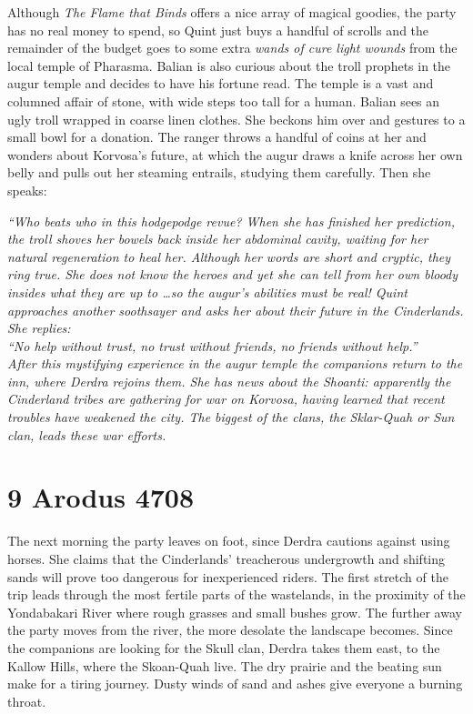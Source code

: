 Although {\itshape The Flame that Binds} offers a nice array of magical goodies, the party has no real money to spend, so Quint just buys a handful of scrolls and the remainder of the budget goes to some extra  {\itshape wands of cure light wounds} from the local temple of Pharasma. Balian is also curious about the troll prophets in the augur temple and decides to have his fortune read. The temple is a vast and columned affair of stone, with wide steps too tall for a human. Balian sees an ugly troll wrapped in coarse linen clothes. She beckons him over and gestures to a small bowl for a donation. The ranger throws a handful of coins at her and wonders about Korvosa's future, at which the augur draws a knife across her own belly and pulls out her steaming entrails, studying them carefully. Then she speaks: {\itshape``Who beats who in this hodgepodge revue?   When she has finished her prediction, the troll shoves her bowels back inside her abdominal cavity, waiting for her natural regeneration to heal her. Although her words are short and cryptic, they ring true. She does not know the heroes and yet she can tell from her own bloody insides what they are up to \ldots so the augur's abilities must be real! Quint approaches another soothsayer and asks her about their future in the Cinderlands. She replies:\\

{\itshape``No help without trust, no trust without friends, no friends without help.}''\\

After this mystifying experience in the augur temple the companions return to the inn, where Derdra rejoins them. She has news about the Shoanti: apparently the Cinderland tribes are gathering for war on Korvosa, having learned that recent troubles have weakened the city. The biggest of the clans, the Sklar-Quah or Sun clan, leads these war efforts.\\

\section{9 Arodus 4708}

The next morning the party leaves on foot, since Derdra cautions against using horses. She claims that the Cinderlands' treacherous undergrowth and shifting sands will prove too dangerous for inexperienced riders. The first stretch of the trip leads through the most fertile parts of the wastelands, in the proximity of the Yondabakari River where rough grasses and small bushes grow. The further away the party moves from the river, the more desolate the landscape becomes. Since the companions are looking for the Skull clan, Derdra takes them east, to the Kallow Hills, where the Skoan-Quah live. The dry prairie and the beating sun make for a tiring journey. Dusty winds of sand and ashes give everyone a burning throat.\\

}
